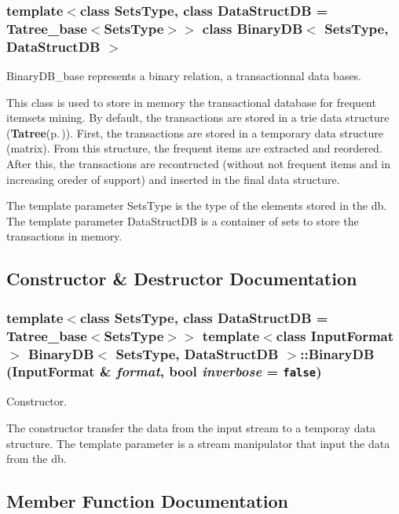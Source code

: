 \subsubsection*{template$<$class Sets\-Type, class Data\-Struct\-DB = Tatree\_\-base$<$Sets\-Type$>$$>$ class Binary\-DB$<$ Sets\-Type, Data\-Struct\-DB $>$}

Binary\-DB\_\-base represents a binary relation, a transactionnal data bases. 

This class is used to store in memory the transactional database for frequent itemsets mining. By default, the transactions are stored in a trie data structure ({\bf Tatree}{\rm (p.\,\pageref{class_tatree})}). First, the transactions are stored in a temporary data structure (matrix). From this structure, the frequent items are extracted and reordered. After this, the transactions are recontructed (without not frequent items and in increasing oreder of support) and inserted in the final data structure.

The template parameter Sets\-Type is the type of the elements stored in the db. The template parameter Data\-Struct\-DB is a container of sets to store the transactions in memory. 



\subsection{Constructor \& Destructor Documentation}
\subsubsection{\setlength{\rightskip}{0pt plus 5cm}template$<$class Sets\-Type, class Data\-Struct\-DB = Tatree\_\-base$<$Sets\-Type$>$$>$ template$<$class Input\-Format$>$ {\bf Binary\-DB}$<$ Sets\-Type, Data\-Struct\-DB $>$::{\bf Binary\-DB} (Input\-Format \& {\em format}, bool {\em inverbose} = {\tt false})\hspace{0.3cm}{\tt  [inline]}}\label{class_binary_d_b_c5adea668e389622e005e7b5d0d50236}


Constructor. 

The constructor transfer the data from the input stream to a temporay data structure. The template parameter is a stream manipulator that input the data from the db. 

\subsection{Member Function Documentation}
